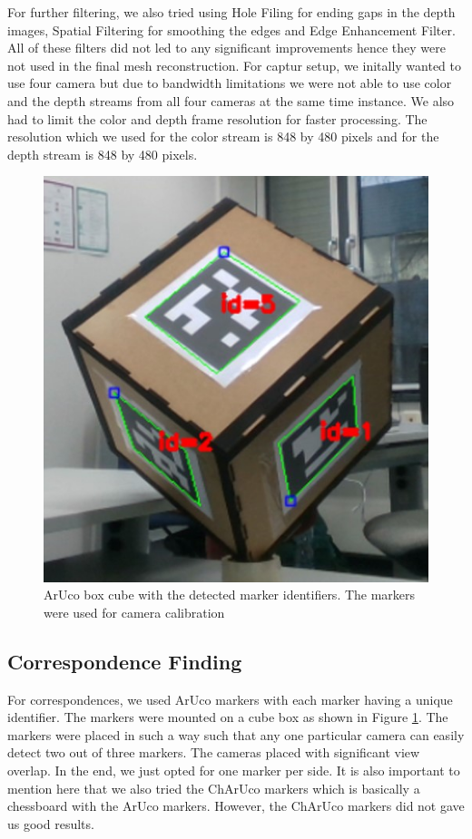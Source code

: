 \documentclass[10pt,twocolumn,letterpaper]{article}
\begin{document}
For further filtering, we also tried using Hole Filing for ending gaps in the depth images, Spatial Filtering for smoothing the edges and Edge Enhancement Filter. All of these filters did not led to any significant improvements hence they were not used in the final mesh reconstruction. For captur setup, we initally wanted to use four camera but due to bandwidth limitations we were not able to use color and the depth streams from all four cameras at the same time instance. We also had to limit the color and depth frame resolution for faster processing. The resolution which we used for the color stream is 848 by 480 pixels and for the depth stream is 848 by 480 pixels.

\begin{figure}[t]
\begin{center}
\includegraphics[width=0.6\linewidth]{imgs/cube}
\end{center}
 \caption{ArUco box cube with the detected marker identifiers. The markers were used for camera calibration}
 \label{fig:cube}
\end{figure}
  
\subsection{Correspondence Finding}
For correspondences, we used ArUco markers with each marker having a unique identifier. The markers were mounted on a cube box as shown in Figure \ref{fig:cube}. The markers were placed in such a way such that any one particular camera can easily detect two out of three markers. The cameras placed with significant view overlap. In the end, we just opted for one marker per side. It is also important to mention here that we also tried the ChArUco markers which is basically a chessboard with the ArUco markers. However, the ChArUco markers did not gave us good results. 
\end{document}
